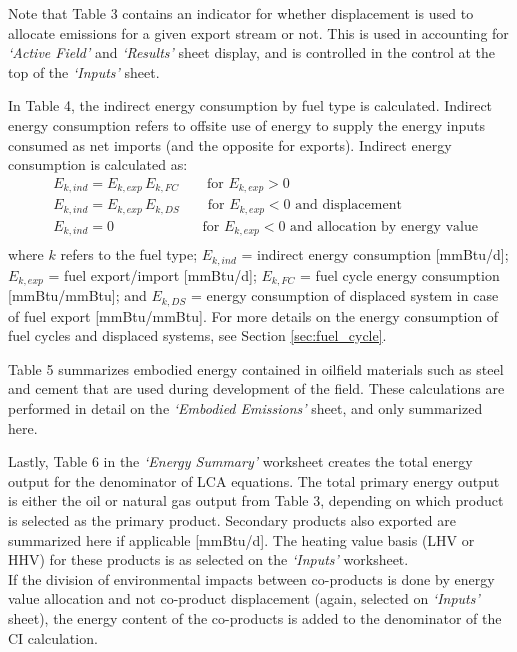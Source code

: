 \documentclass[11pt]{report}
\newcommand{\sheet}[1]{\textit{`{#1}'}}
\begin{document}
Note that Table 3 contains an indicator for whether displacement is used to allocate emissions for a given export stream or not. This is used in accounting for \sheet{Active Field} and \sheet{Results} sheet display, and is controlled in the control at the top of the \sheet{Inputs} sheet.

In Table 4, the indirect energy consumption by fuel type is calculated. Indirect energy consumption refers to offsite use of energy to supply the energy inputs consumed as net imports (and the opposite for exports). Indirect energy consumption is calculated as:
\begin{equation}
\begin{split}
& E_{k,ind} = E_{k,exp} \, E_{k,FC} \quad\quad \text{for}\,\, E_{k,exp} > 0\\
& E_{k,ind} = E_{k,exp} \, E_{k,DS} \quad\quad \text{for}\,\, E_{k,exp} < 0 \,\,\text{and displacement}\\ 
& E_{k,ind} = 0 \quad\quad\quad\quad\quad\quad\,\, \text{for}\,\, E_{k,exp} < 0 \,\,\text{and allocation by energy value}\\
\end{split}
\end{equation}
where $k$ refers to the fuel type; $E_{k,ind}$ = indirect energy consumption [mmBtu/d]; $E_{k,exp}$ = fuel export/import [mmBtu/d]; $E_{k,FC}$ = fuel cycle energy consumption [mmBtu/mmBtu]; and $E_{k,DS}$ = energy consumption of displaced system in case of fuel export [mmBtu/mmBtu]. For more details on the energy consumption of fuel cycles and displaced systems, see Section \ref{sec:fuel_cycle}.

Table 5 summarizes embodied energy contained in oilfield materials such as steel and cement that are used during development of the field. These calculations are performed in detail on the \sheet{Embodied Emissions} sheet, and only summarized here.

Lastly, Table 6 in the \sheet{Energy Summary} worksheet creates the total energy output for the denominator of LCA equations. The total primary energy output is either the oil or natural gas output from Table 3, depending on which product is selected as the primary product. Secondary products also exported are summarized here if applicable [mmBtu/d]. The heating value basis (LHV or HHV) for these products is as selected on the \sheet{Inputs} worksheet. \\

If the division of environmental impacts between co-products is done by energy value allocation and not co-product displacement (again, selected on \sheet{Inputs} sheet), the energy content of the co-products is added to the denominator of the CI calculation.
\end{document}
